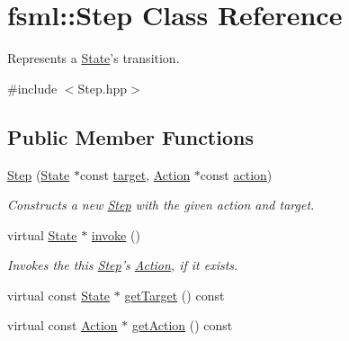 \hypertarget{classfsml_1_1Step}{\section{fsml\-:\-:Step Class Reference}
\label{classfsml_1_1Step}
}


Represents a \hyperlink{classfsml_1_1State}{State}'s transition.  




{\ttfamily \#include $<$Step.\-hpp$>$}

\subsection*{Public Member Functions}
\begin{DoxyCompactItemize}
\item 
\hyperlink{classfsml_1_1Step_a5f656cb2f850f8a24afc710f4904ef43}{Step} (\hyperlink{classfsml_1_1State}{State} $\ast$const \hyperlink{classfsml_1_1Step_a02a455c14aa6b6435137d37040da1576}{target}, \hyperlink{classfsml_1_1Action}{Action} $\ast$const \hyperlink{classfsml_1_1Step_acefa781aa49679af3c151194e58c6a85}{action})
\begin{DoxyCompactList}\small\item\em Constructs a new \hyperlink{classfsml_1_1Step}{Step} with the given action and target. \end{DoxyCompactList}\item 
virtual \hyperlink{classfsml_1_1State}{State} $\ast$ \hyperlink{classfsml_1_1Step_ab71a0687e8cfff12deed6b1916ff1ba3}{invoke} ()
\begin{DoxyCompactList}\small\item\em Invokes the this \hyperlink{classfsml_1_1Step}{Step}'s \hyperlink{classfsml_1_1Action}{Action}, if it exists. \end{DoxyCompactList}\item 
virtual const \hyperlink{classfsml_1_1State}{State} $\ast$ \hyperlink{classfsml_1_1Step_a1d0ba0e93765b946de082651f68cd3fb}{get\-Target} () const 
\item 
virtual const \hyperlink{classfsml_1_1Action}{Action} $\ast$ \hyperlink{classfsml_1_1Step_a7d310d684bca136ddc95ca8454dfad40}{get\-Action} () const 
\end{DoxyCompactItemize}
